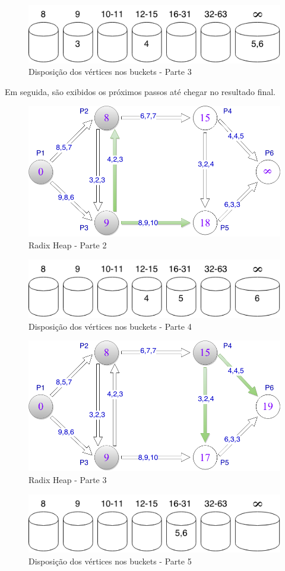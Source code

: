 \begin{figure}[htbp]
\centering
 \includegraphics[width=.50\textwidth]{chapters/fig/buckets3.png}
\caption{Disposição dos vértices nos buckets - Parte 3}
\label{fig:buckets3}
\end{figure}
\FloatBarrier

Em seguida, são exibidos os próximos passos até chegar no resultado final.
\begin{figure}[htbp]
\centering
 \includegraphics[width=.50\textwidth]{chapters/fig/limitesup2.png}
\caption{Radix Heap - Parte 2}
\label{fig:limitesup2}
\end{figure}
\FloatBarrier
\begin{figure}[htbp]
\centering
 \includegraphics[width=.50\textwidth]{chapters/fig/buckets4.png}
\caption{Disposição dos vértices nos buckets - Parte 4}
\label{fig:buckets4}
\end{figure}
\FloatBarrier
\begin{figure}[htbp]
\centering
 \includegraphics[width=.50\textwidth]{chapters/fig/limitesup3.png}
\caption{Radix Heap - Parte 3}
\label{fig:limitesup3}
\end{figure}
\FloatBarrier
\begin{figure}[htbp]
\centering
 \includegraphics[width=.50\textwidth]{chapters/fig/buckets5.png}
\caption{Disposição dos vértices nos buckets - Parte 5}
\label{fig:buckets5}
\end{figure}
\FloatBarrier

